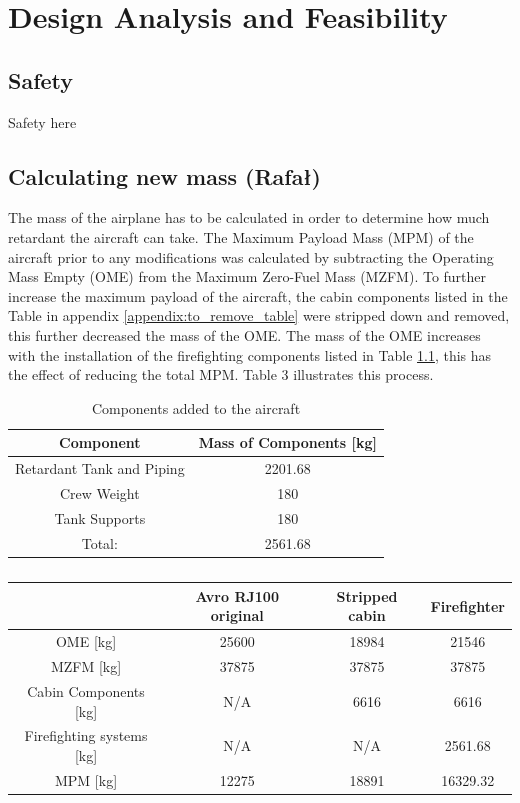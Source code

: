 \chapter{Design Analysis and Feasibility}
\section{Safety}
Safety here


\section{Calculating new mass (Rafał)}
The mass of the airplane has to be calculated in order to determine how much retardant the aircraft can take.
The Maximum Payload Mass (MPM) of the aircraft prior to any modifications was calculated by subtracting the Operating Mass Empty (OME) from the Maximum Zero-Fuel Mass (MZFM). To further increase the maximum payload of the aircraft, the cabin components listed in the Table in appendix \ref{appendix:to_remove_table} were stripped down and removed, this further decreased the mass of the OME. The mass of the OME increases with the installation of the firefighting components listed in Table \ref{tab:added_components}, this has the effect of reducing the total MPM. Table 3 illustrates this process.

\begin{table}[h!]
\centering
\begin{tabular}{|c|c|}
\hline
Component                 & Mass of Components {[}kg{]} \\
\hline
Retardant Tank and Piping & 2201.68                     \\
Crew Weight               & 180                         \\
Tank Supports             & 180                         \\
\hline
Total:                    & 2561.68                    \\
\hline
\end{tabular}
\caption{Components added to the aircraft}
  \label{tab:added_components}
\end{table}

\begin{table}[]
\begin{tabular}{|c|c|c|c|}
\hline
                              & Avro RJ100 original & Stripped cabin & Firefighter \\
\hline
OME {[}kg{]}                  & 25600               & 18984          & 21546       \\
MZFM {[}kg{]}                 & 37875               & 37875          & 37875       \\
Cabin Components {[}kg{]}     & N/A                 & 6616           & 6616        \\
Firefighting systems {[}kg{]} & N/A                 & N/A            & 2561.68     \\
MPM {[}kg{]}                  & 12275               & 18891          & 16329.32   \\
\hline
\end{tabular}
\caption{}
\label{tab:my-table}
\end{table}

